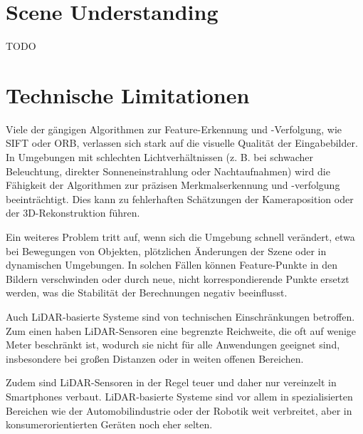 \section{Scene Understanding}

TODO

\section{Technische Limitationen}

Viele der gängigen Algorithmen zur Feature-Erkennung und -Verfolgung, wie SIFT oder ORB, verlassen sich stark auf die visuelle Qualität der Eingabebilder. In Umgebungen mit schlechten Lichtverhältnissen (z. B. bei schwacher Beleuchtung, direkter Sonneneinstrahlung oder Nachtaufnahmen) wird die Fähigkeit der Algorithmen zur präzisen Merkmalserkennung und -verfolgung beeinträchtigt. Dies kann zu fehlerhaften Schätzungen der Kameraposition oder der 3D-Rekonstruktion führen.

Ein weiteres Problem tritt auf, wenn sich die Umgebung schnell verändert, etwa bei Bewegungen von Objekten, plötzlichen Änderungen der Szene oder in dynamischen Umgebungen. In solchen Fällen können Feature-Punkte in den Bildern verschwinden oder durch neue, nicht korrespondierende Punkte ersetzt werden, was die Stabilität der Berechnungen negativ beeinflusst.

Auch LiDAR-basierte Systeme sind von technischen Einschränkungen betroffen. Zum einen haben LiDAR-Sensoren eine begrenzte Reichweite, die oft auf wenige Meter beschränkt ist, wodurch sie nicht für alle Anwendungen geeignet sind, insbesondere bei großen Distanzen oder in weiten offenen Bereichen.

Zudem sind LiDAR-Sensoren in der Regel teuer und daher nur vereinzelt in Smartphones verbaut. LiDAR-basierte Systeme sind vor allem in spezialisierten Bereichen wie der Automobilindustrie oder der Robotik weit verbreitet, aber in konsumerorientierten Geräten noch eher selten.